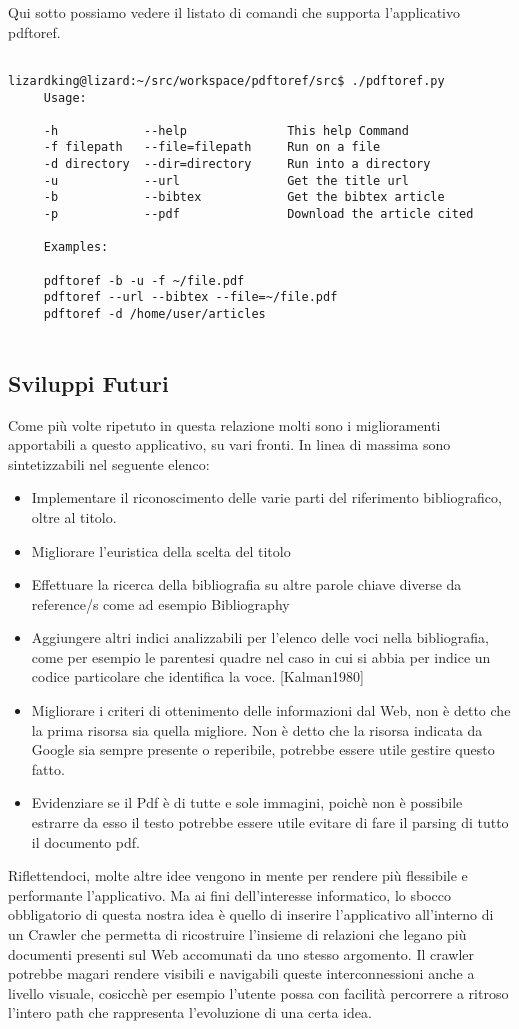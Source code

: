 Qui sotto possiamo vedere il listato di comandi che supporta l'applicativo pdftoref.
\begin{verbatim}

lizardking@lizard:~/src/workspace/pdftoref/src$ ./pdftoref.py
     Usage: 

     -h            --help              This help Command 
     -f filepath   --file=filepath     Run on a file 
     -d directory  --dir=directory     Run into a directory 
     -u            --url               Get the title url 
     -b            --bibtex            Get the bibtex article 
     -p            --pdf               Download the article cited
 
     Examples:

     pdftoref -b -u -f ~/file.pdf
     pdftoref --url --bibtex --file=~/file.pdf
     pdftoref -d /home/user/articles 


\end{verbatim}

\subsection{Sviluppi Futuri}\label{sviluppifuturi}
Come più volte ripetuto in questa relazione molti sono i miglioramenti apportabili a questo applicativo, su vari fronti. In linea di massima sono sintetizzabili nel seguente elenco:

\begin{itemize}
\item Implementare il riconoscimento delle varie parti del riferimento bibliografico, oltre al titolo. 
\item Migliorare l'euristica della scelta del titolo
\item Effettuare la ricerca della bibliografia su altre parole chiave diverse da reference/s come ad esempio Bibliography
\item Aggiungere altri indici analizzabili per l'elenco delle voci nella bibliografia, come per esempio le parentesi quadre nel caso in cui si abbia per indice un codice particolare che identifica la voce. [Kalman1980]
\item Migliorare i criteri di ottenimento delle informazioni dal Web, non è detto che la prima risorsa sia quella migliore. Non è detto che la risorsa indicata da Google sia sempre presente o reperibile, potrebbe essere utile gestire questo fatto.
\item Evidenziare se il Pdf è di tutte e sole immagini, poichè non è possibile estrarre da esso il testo potrebbe essere utile evitare di fare il parsing di tutto il documento pdf.
\end{itemize}

Riflettendoci, molte altre idee vengono in mente per rendere più flessibile e performante l'applicativo. Ma ai fini dell'interesse informatico, lo sbocco obbligatorio di questa nostra idea è quello di inserire l'applicativo all'interno di un Crawler che permetta di ricostruire l'insieme di relazioni che legano più documenti presenti sul Web accomunati da uno stesso argomento. Il crawler potrebbe magari rendere visibili e navigabili queste interconnessioni anche a livello visuale, cosicchè per esempio l'utente possa con facilità percorrere a ritroso l'intero path che rappresenta l'evoluzione di una certa idea.

